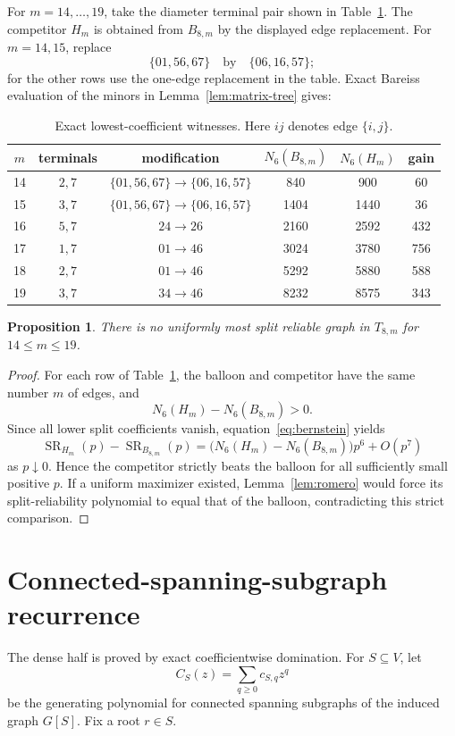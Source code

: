 \documentclass[11pt]{article}
\newtheorem{proposition}[theorem]{Proposition}
\newcommand{\SR}{\operatorname{SR}}
\begin{document}
For $m=14,\ldots,19$, take the diameter terminal pair shown in Table~\ref{tab:sparse}. The competitor $H_m$ is obtained from $B_{8,m}$ by the displayed edge replacement. For $m=14,15$, replace
\[
 \{01,56,67\}\quad\text{by}\quad\{06,16,57\};
\]
for the other rows use the one-edge replacement in the table. Exact Bareiss evaluation of the minors in Lemma~\ref{lem:matrix-tree} gives:

\begin{table}[h]
\centering
\begin{tabular}{c c c c c c}
\toprule
$m$ & terminals & modification & $N_6(B_{8,m})$ & $N_6(H_m)$ & gain\\
\midrule
14 & $2,7$ & $\{01,56,67\}\to\{06,16,57\}$ & 840 & 900 & 60\\
15 & $3,7$ & $\{01,56,67\}\to\{06,16,57\}$ & 1404 & 1440 & 36\\
16 & $5,7$ & $24\to26$ & 2160 & 2592 & 432\\
17 & $1,7$ & $01\to46$ & 3024 & 3780 & 756\\
18 & $2,7$ & $01\to46$ & 5292 & 5880 & 588\\
19 & $3,7$ & $34\to46$ & 8232 & 8575 & 343\\
\bottomrule
\end{tabular}
\caption{Exact lowest-coefficient witnesses. Here $ij$ denotes edge $\{i,j\}$.}
\label{tab:sparse}
\end{table}

\begin{proposition}\label{prop:sparse}
There is no uniformly most split reliable graph in $T_{8,m}$ for $14\le m\le19$.
\end{proposition}
\begin{proof}
For each row of Table~\ref{tab:sparse}, the balloon and competitor have the same number $m$ of edges, and
\[
 N_6(H_m)-N_6(B_{8,m})>0.
\]
Since all lower split coefficients vanish, equation~\eqref{eq:bernstein} yields
\[
 \SR_{H_m}(p)-\SR_{B_{8,m}}(p)
 =\bigl(N_6(H_m)-N_6(B_{8,m})\bigr)p^6+O(p^7)
\]
as $p\downarrow0$. Hence the competitor strictly beats the balloon for all sufficiently small positive $p$. If a uniform maximizer existed, Lemma~\ref{lem:romero} would force its split-reliability polynomial to equal that of the balloon, contradicting this strict comparison.
\end{proof}

\section{Connected-spanning-subgraph recurrence}
The dense half is proved by exact coefficientwise domination. For $S\subseteq V$, let
\[
 C_S(z)=\sum_{q\ge0} c_{S,q}z^q
\]
be the generating polynomial for connected spanning subgraphs of the induced graph $G[S]$. Fix a root $r\in S$.
\end{document}
